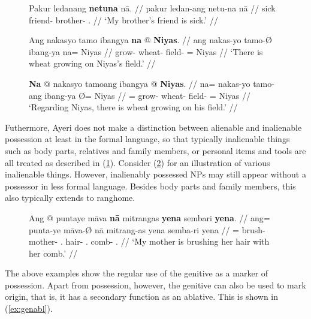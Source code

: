\begin{figure}[h]
\pex\label{ex:genmarking}
\a\begingl
	\gla Pakur ledanang \textbf{netuna} nā. //
	\glb pakur ledan-ang netu-na nā //
	\glc sick friend-\Aarg{} brother-\Gen{} \Fsg{}.\Gen{} //
	\glft `My brother's friend is sick.' //
\endgl


\a\begingl
	\gla Ang nakasyo tamo ibangya \textbf{na} @ \textbf{Niyas}. //
	\glb ang nakas-yo tamo-Ø ibang-ya na= Niyas //
	\glc \AgtT{} grow-\TsgN{} wheat-\Top{} field-\Loc{} \Gen{}= Niyas //
	\glft `There is wheat growing on Niyas's field.' //
\endgl

\a\begingl
	\gla \textbf{Na} @ nakasyo tamoang ibangya {} @ \textbf{Niyas}. //
	\glb na= nakas-yo tamo-ang ibang-ya Ø= Niyas //
	\glc \GenT{}= grow-\TsgN{} wheat-\Aarg{} field-\Loc{} \Top{}= Niyas //
	\glft `Regarding Niyas, there is wheat growing on his field.' //
\endgl
\xe
\end{figure}

Futhermore, Ayeri does not make a distinction between alienable and inalienable
possession at least in the formal language, so that typically inalienable
things such as body parts, relatives and family members, or personal items and
tools are all treated as described in (\ref{ex:genmarking}). Consider
(\ref{ex:inalposs}) for an illustration of various inalienable things. However,
inalienably possessed NPs may still appear without a possessor in less
formal language. Besides body parts and family members, this also typically extends to 
{rang}{home}.

\begin{figure}
\ex\label{ex:inalposs}
\begingl
	\gla Ang @ puntaye māva \textbf{nā} mitrangas \textbf{yena} sembari 
		\textbf{yena}. //
	\glb ang= punta-ye māva-Ø nā mitrang-as yena semba-ri 
		yena //
	\glc \AgtT{}= brush-\TsgF{} mother-\Top{} \Fsg{}.\Gen{} hair-\Parg{} 
		\TsgF{}.\Gen{} comb-\Ins{} \TsgF{}.\Gen{} //
	\glft `My mother is brushing her hair with her comb.' //
\endgl\xe
\end{figure}

The above examples show the regular use of the genitive as a marker of
possession. Apart from possession, however, the genitive can also be used to
mark origin, that is, it has a secondary function as an ablative. This is shown
in (\ref{ex:genabl}).

